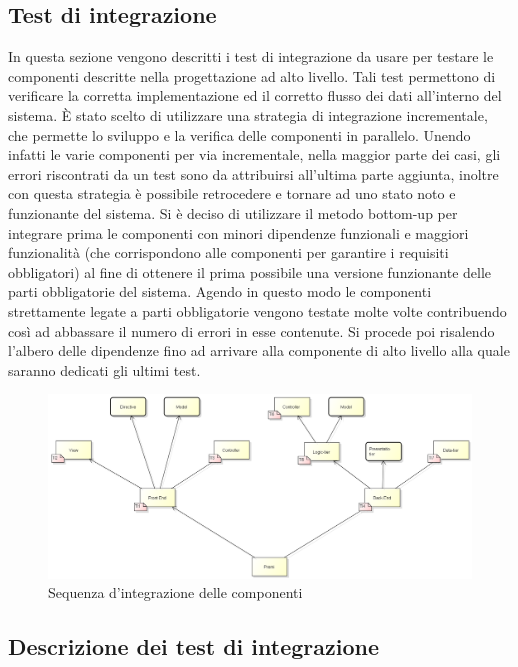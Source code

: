 \newpage

\subsection{Test di integrazione}
In questa sezione vengono descritti i test di integrazione da usare per testare le componenti descritte nella progettazione ad alto livello. Tali test permettono di verificare la corretta implementazione ed il corretto flusso dei dati all'interno del sistema. È stato scelto di utilizzare una strategia di integrazione incrementale, che permette lo sviluppo e la verifica delle componenti in parallelo. Unendo infatti le varie componenti per via incrementale, nella maggior parte dei casi, gli errori riscontrati da un test sono da attribuirsi all'ultima parte aggiunta, inoltre con questa strategia è possibile retrocedere e tornare ad uno stato noto e funzionante del sistema. Si è deciso di utilizzare il metodo \gls{bottom-up} per integrare prima le componenti con minori dipendenze funzionali e maggiori funzionalità (che corrispondono alle componenti per garantire i requisiti obbligatori) al fine di ottenere il prima possibile una versione funzionante delle parti obbligatorie del sistema. Agendo in questo modo le componenti strettamente legate a parti obbligatorie vengono testate molte volte contribuendo così ad abbassare il numero di errori in esse contenute. Si procede poi risalendo l'albero delle dipendenze fino ad arrivare alla componente di alto livello alla quale saranno dedicati gli ultimi test.

\begin{figure}[h]
\centering
\includegraphics[width=1\linewidth]{img/Integrazione_componenti.png}
\caption[Sequenza d'integrazione delle componenti]{Sequenza d'integrazione delle componenti}
\label{fig:Integrazione_componenti}
\end{figure}

\subsection{Descrizione dei test di integrazione}


